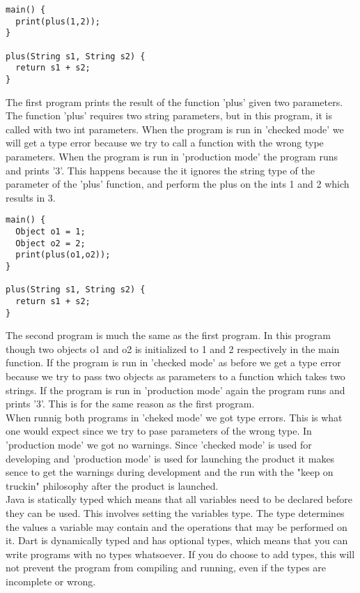 \begin{verbatim}
main() {
  print(plus(1,2));
}

plus(String s1, String s2) {
  return s1 + s2;
}
\end{verbatim}
The first program prints the result of the function 'plus' given two parameters. The function 'plus' requires two string parameters, but in this program, it is called with two int parameters. When the program is run in 'checked mode' we will get a type error because we try to call a function with the wrong type parameters. When the program is run in 'production mode' the program runs and prints '3'. This happens because the it ignores the string type of the parameter of the 'plus' function, and perform the plus on the ints 1 and 2 which results in 3.

\begin{verbatim}
main() {
  Object o1 = 1;
  Object o2 = 2;
  print(plus(o1,o2));
}

plus(String s1, String s2) {
  return s1 + s2;
}
\end{verbatim}
The second program is much the same as the first program. In this program though two objects o1 and o2 is initialized to 1 and 2 respectively in the main function. If the program is run in 'checked mode' as before we get a type error because we try to pass two objects as parameters to a function which takes two strings. If the program is run in 'production mode' again the program runs and prints '3'. This is for the same reason as the first program.\\

When runnig both programs in 'cheked mode' we got type errors. This is what one would expect since we try to pase parameters of the wrong type. In 'production mode' we got no warnings. Since 'checked mode' is used for developing and 'production mode' is used for launching the product it makes sence to get the warnings during development and the run with the "keep on truckin" philosophy after the product is launched.\\

Java is statically typed which means that all variables need to be declared before they can be used. This involves setting the variables type. The type determines the values a variable may contain and the operations that may be performed on it. Dart is dynamically typed and has optional types, which means that you can write programs with no types whatsoever. If you do choose to add types, this will not prevent the program from compiling and running, even if the types are incomplete or wrong.
